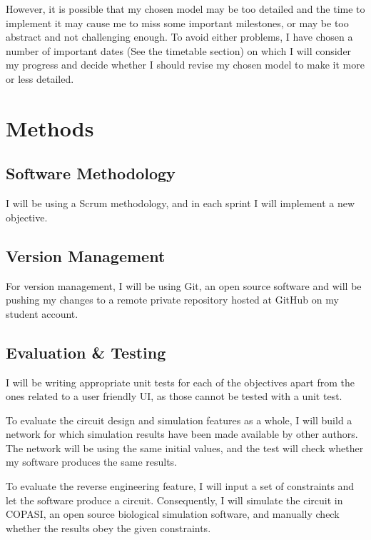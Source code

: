 \documentclass{article}
\begin{document}
	\par However, it is possible that my chosen model may be too detailed and the time to implement it may cause me to miss some important milestones, or may be too abstract and not challenging enough. To avoid either problems, I have chosen a number of important dates (See the timetable section) on which I will consider my progress and decide whether I should revise my chosen model to make it more or less detailed.
	
	
	\section{Methods}
	
	\subsection{Software Methodology}
	\par I will be using a Scrum methodology, and in each sprint I will implement a new objective.

		
	\subsection{Version Management}
	\par For version management, I will be using Git, an open source software and will be pushing my changes to a remote private repository hosted at GitHub on my student account.
	
	\subsection{Evaluation \& Testing}
	\par I will be writing appropriate unit tests for each of the objectives apart from the ones related to a user friendly UI, as those cannot be tested with a unit test.
	\par To evaluate the circuit design and simulation features as a whole, I will build a network for which simulation results have been made available by other authors. The network will be using the same initial values, and the test will check whether my software produces the same results. 
	\par To evaluate the reverse engineering feature, I will input a set of constraints and let the software produce a circuit. Consequently, I will simulate the circuit in COPASI\cite{copasi}, an open source biological simulation software, and manually check whether the results obey the given constraints.
	
\end{document}
